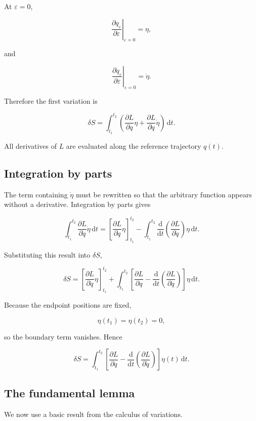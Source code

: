 At \(\varepsilon=0\),

\[
\left.
\frac{\partial q_{\varepsilon}}{\partial\varepsilon}
\right|_{\varepsilon=0}
=
\eta,
\]

and

\[
\left.
\frac{\partial\dot q_{\varepsilon}}{\partial\varepsilon}
\right|_{\varepsilon=0}
=
\dot\eta.
\]

Therefore the first variation is

\[
\delta S
=
\int_{t_{1}}^{t_{2}}
\left(
\frac{\partial L}{\partial q}\eta
+
\frac{\partial L}{\partial\dot q}\dot\eta
\right)
\,\mathrm{d}t.
\]

All derivatives of \(L\) are evaluated along the reference trajectory \(q(t)\).

\subsection{Integration by parts}

The term containing \(\dot\eta\) must be rewritten so that the arbitrary function appears without a derivative. Integration by parts gives

\[
\int_{t_{1}}^{t_{2}}
\frac{\partial L}{\partial\dot q}\dot\eta
\,\mathrm{d}t
=
\left[
\frac{\partial L}{\partial\dot q}\eta
\right]_{t_{1}}^{t_{2}}
-
\int_{t_{1}}^{t_{2}}
\frac{\mathrm{d}}{\mathrm{d}t}
\left(
\frac{\partial L}{\partial\dot q}
\right)
\eta
\,\mathrm{d}t.
\]

Substituting this result into \(\delta S\),

\[
\delta S
=
\left[
\frac{\partial L}{\partial\dot q}\eta
\right]_{t_{1}}^{t_{2}}
+
\int_{t_{1}}^{t_{2}}
\left[
\frac{\partial L}{\partial q}
-
\frac{\mathrm{d}}{\mathrm{d}t}
\left(
\frac{\partial L}{\partial\dot q}
\right)
\right]
\eta
\,\mathrm{d}t.
\]

Because the endpoint positions are fixed,

\[
\eta(t_{1})=\eta(t_{2})=0,
\]

so the boundary term vanishes. Hence

\[
\delta S
=
\int_{t_{1}}^{t_{2}}
\left[
\frac{\partial L}{\partial q}
-
\frac{\mathrm{d}}{\mathrm{d}t}
\left(
\frac{\partial L}{\partial\dot q}
\right)
\right]
\eta(t)
\,\mathrm{d}t.
\]

\subsection{The fundamental lemma}

We now use a basic result from the calculus of variations.

